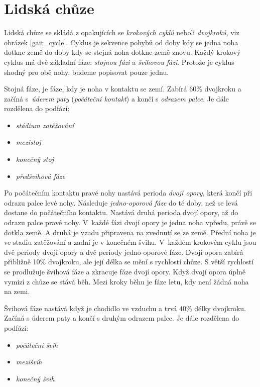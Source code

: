 \chapter{Lidská chůze}
Lidská chůze \cite{gait_review} se skládá z opakujících se \textit{krokových cyklů} neboli \textit{dvojkroků}, viz obrázek \ref{gait_cycle}. Cyklus je sekvence pohybů od doby kdy se jedna noha dotkne země do doby kdy se stejná noha dotkne země znovu. Každý krokový cyklus má dvě základní fáze: \textit{stojnou fázi} a \textit{švihovou fázi}. Protože je cyklus shodný pro obě nohy, budeme popisovat pouze jednu.

Stojná fáze, je fáze, kdy je noha v kontaktu se zemí. Zabírá 60\% dvojkroku a začíná s~\textit{úderem paty} (\textit{počáteční kontakt}) a končí s \textit{odrazem palce}. Je dále rozdělena do podfází:
\begin{itemize}
\item \textit{stádium zatěžování}
\item \textit{mezistoj}
\item \textit{konečný stoj}
\item \textit{předšvihová fáze}
\end{itemize}
Po počátečním kontaktu pravé nohy nastává perioda \textit{dvojí opory}, která končí při odrazu palce levé nohy. Následuje \textit{jedno-oporová fáze} do té doby, než se levá dostane do počátečního kontaktu. Nastává druhá perioda dvojí opory, až do odrazu palce pravé nohy. V~každé fázi dvojí opory je jedna noha vpředu, právě se dotkla země. A druhá je vzadu připravena na zvednutí se ze země. Přední noha je ve stadiu zatěžování  a zadní je v konečném švihu. V~každém krokovém cyklu jsou dvě periody dvojí opory a dvě periody jedno-oporové fáze. Dvojí opora zabírá přibližně 10\% dvojkroku, ale její délka se mění s rychlostí chůze. S větší rychlostí se prodlužuje švihová fáze a zkracuje fáze dvojí opory. Když dvojí opora úplně vymizí z chůze se stává běh. Mezi kroky běhu je fáze letu, kdy není žádná noha na zemi.

Švihová fáze nastává když je chodidlo ve vzduchu a trvá 40\% délky dvojkroku. Začíná s úderem paty a končí s druhým odrazem palce.  Je dále rozdělena do podfází:
\begin{itemize}
\item \textit{počáteční švih}
\item \textit{mezišvih}
\item \textit{konečný švih}
\end{itemize}

